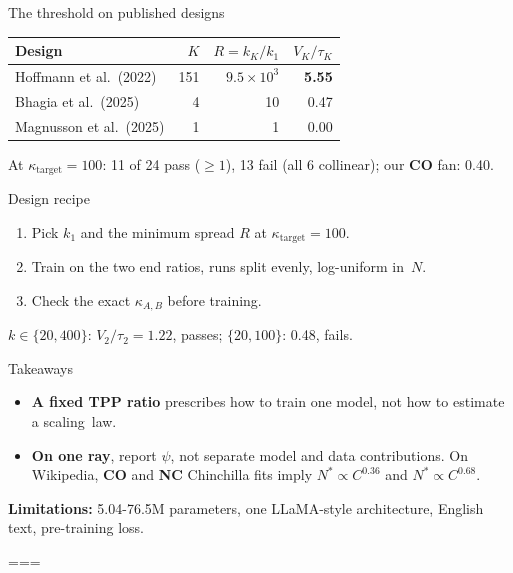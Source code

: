 \documentclass[final]{beamer}
\newcommand{\tunePublished}{0.19cm}      %
\newcommand{\tuneRecipe}{-0.49cm}        %
\newcommand{\tuneTakeaways}{-0.47cm}     %
\newcommand{\tuneRecipeListEnd}{-0.25cm} %
\newcommand{\tuneTakeawaysListEnd}{-0.48cm} %
\newcommand{\tableStretch}{1.25}
\newcommand{\CO}{\textcolor{co}{\textbf{CO}}}
\newcommand{\NC}{\textcolor{nc}{\textbf{NC}}}
\newcommand{\opencorr}[1]{\vskip#1\relax}
\newcommand{\cardgap}{\par\vskip1cm}
\newlength{\herogap}\newlength{\herobase}\setlength{\herobase}{0.5cm}\newlength{\herodelta}\setlength{\herodelta}{0.05cm}
\newlength{\bodyheight}\setlength{\bodyheight}{68.4cm}
\newlength{\colw}\setlength{\colw}{43.333cm}
\begin{document}
\begin{frame}[t]
\begin{textblock*}{\colw}
\begin{minipage}[t][\bodyheight][t]{\colw}
{\begin{card}{The threshold on published designs}
  \opencorr{\tunePublished}
  {\centering\renewcommand{\arraystretch}{\tableStretch}\begin{tabular}{@{}lrrr@{}}
    \toprule
    Design & $K$ & $R = k_K / k_1$ & $V_K / \tau_K$ \\
    \midrule
    Hoffmann et al.\ (2022) & 151 & $9.5 \times 10^3$ & \textbf{5.55} \\
    Bhagia et al.\ (2025) & 4 & 10 & 0.47 \\
    Magnusson et al.\ (2025) & 1 & 1 & 0.00 \\
    \bottomrule
  \end{tabular}\par}
  At $\kappa_{\mathrm{target}} = 100$: 11 of 24 pass ($\geq 1$), 13 fail (all 6 collinear); our \CO{} fan: 0.40.
\end{card}\cardgap
\begin{card}{Design recipe}
  \opencorr{\tuneRecipe}
  \begin{enumerate}
    \item Pick $k_1$ and the minimum spread $R$ at $\kappa_{\mathrm{target}} = 100$.
    \item Train on the two end ratios, runs split evenly, log-uniform \mbox{in $N$.}
    \item Check the exact $\kappa_{A,B}$ before training.
  \end{enumerate}\vskip\tuneRecipeListEnd
  $k \in \{20, 400\}$: $V_2 / \tau_2 = 1.22$, passes; $\{20, 100\}$: 0.48, fails.
\end{card}\cardgap
\begin{alertcard}{Takeaways}
  \opencorr{\tuneTakeaways}
  \begin{itemize}
    \item \textbf{A fixed TPP ratio} prescribes how to train one model, not how to estimate a scaling~law.
    \item \textbf{On one ray}, report $\psi$, not separate model and data contributions. On Wikipedia, \CO{} and \NC{} Chinchilla fits imply $N^* \propto C^{0.36}$ and $N^* \propto C^{0.68}$.
  \end{itemize}\vskip\tuneTakeawaysListEnd
  \textbf{Limitations:} 5.04-76.5M parameters, one LLaMA-style architecture, English text, pre-training loss.
\end{alertcard}
}%
\setlength{\herogap}{0pt}\setbox\colstack=\vbox{\hsize=\colw\linewidth=\colw\Cthreecards}%
\setlength{\herogap}{\dimexpr(\bodyheight-\ht\colstack-\dp\colstack)/2\relax}%
\Cthreecards
\end{minipage}
\end{textblock*}


\end{frame}
\end{document}
